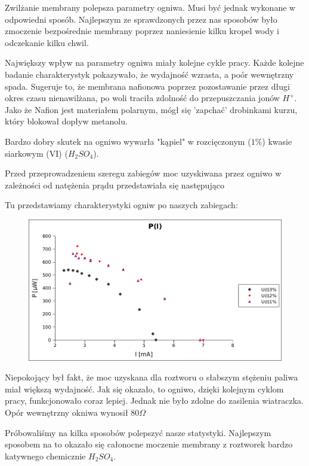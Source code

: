 \documentclass[a4paper,12pt]{article}
\begin{document}
Zwilżanie membrany polepsza parametry ogniwa. Musi być jednak wykonane w odpowiedni sposób. Najlepszym ze sprawdzonych przez nas sposobów było zmoczenie bezpośrednie membrany poprzez naniesienie kilku kropel wody i odczekanie kilku chwil.

Największy wpływ na parametry ogniwa miały kolejne cykle pracy. Każde kolejne badanie charakterystyk pokazywało, że wydajność wzrasta, a poór wewnętrzny spada. Sugeruje to, że membrana nafionowa poprzez pozostawanie przez długi okres czasu nienawilżana, po woli traciła zdolność do przepuszczania jonów $H^+$. Jako że Nafion jest materiałem polarnym, mógł się 'zapchać' drobinkami kurzu, który blokował dopływ metanolu.

Bardzo dobry skutek na ogniwo wywarła "kąpiel" w rozcięczonym ($1\%$) kwasie siarkowym (VI) ($ H_2SO_4 $).

Przed przeprowadzeniem szeregu zabiegów moc uzyskiwana przez ogniwo w zależności od natężenia prądu przedstawiała się następująco



Tu przedstawiamy charakterystyki ogniw po naszych zabiegach:

\begin{figure} [H]
 \begin{center}
    \includegraphics[width = 15cm]{przed.png}
  \end{center}
\end{figure}
Niepokojący był fakt, że moc uzyskana dla roztworu o słabszym stężeniu paliwa miał większą wydajność. Jak się okazało, to ogniwo, dzięki kolejnym cyklom pracy, funkcjonowało coraz lepiej. Jednak nie było zdolne do zasilenia wiatraczka. Opór wewnętrzny okniwa wynosił $80 \Omega $


Próbowaliśmy na kilka sposobów polepszyć nasze statystyki. Najlepszym sposobem na to okazało się całonocne moczenie membrany z roztworek bardzo katywnego chemicznie $ H_2SO_4 $. 
\end{document}
